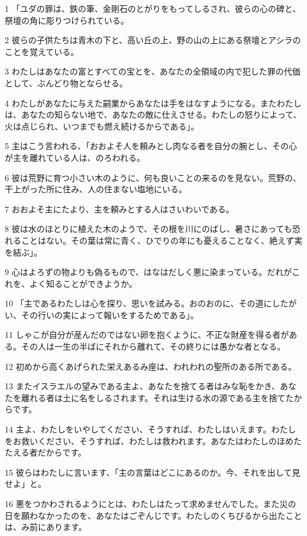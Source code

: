 \par 1 「ユダの罪は、鉄の筆、金剛石のとがりをもってしるされ、彼らの心の碑と、祭壇の角に彫りつけられている。
\par 2 彼らの子供たちは青木の下と、高い丘の上、野の山の上にある祭壇とアシラのことを覚えている。
\par 3 わたしはあなたの富とすべての宝とを、あなたの全領域の内で犯した罪の代価として、ぶんどり物とならせる。
\par 4 わたしがあなたに与えた嗣業からあなたは手をはなすようになる。またわたしは、あなたの知らない地で、あなたの敵に仕えさせる。わたしの怒りによって、火は点じられ、いつまでも燃え続けるからである」。
\par 5 主はこう言われる、「おおよそ人を頼みとし肉なる者を自分の腕とし、その心が主を離れている人は、のろわれる。
\par 6 彼は荒野に育つ小さい木のように、何も良いことの来るのを見ない。荒野の、干上がった所に住み、人の住まない塩地にいる。
\par 7 おおよそ主にたより、主を頼みとする人はさいわいである。
\par 8 彼は水のほとりに植えた木のようで、その根を川にのばし、暑さにあっても恐れることはない。その葉は常に青く、ひでりの年にも憂えることなく、絶えず実を結ぶ」。
\par 9 心はよろずの物よりも偽るもので、はなはだしく悪に染まっている。だれがこれを、よく知ることができようか。
\par 10 「主であるわたしは心を探り、思いを試みる。おのおのに、その道にしたがい、その行いの実によって報いをするためである」。
\par 11 しゃこが自分が産んだのではない卵を抱くように、不正な財産を得る者がある。その人は一生の半ばにそれから離れて、その終りには愚かな者となる。
\par 12 初めから高くあげられた栄えあるみ座は、われわれの聖所のある所である。
\par 13 またイスラエルの望みである主よ、あなたを捨てる者はみな恥をかき、あなたを離れる者は土に名をしるされます。それは生ける水の源である主を捨てたからです。
\par 14 主よ、わたしをいやしてください、そうすれば、わたしはいえます。わたしをお救いください、そうすれば、わたしは救われます。あなたはわたしのほめたたえる者だからです。
\par 15 彼らはわたしに言います、「主の言葉はどこにあるのか。今、それを出して見せよ」と。
\par 16 悪をつかわされるようにとは、わたしはたって求めませんでした。また災の日を願わなかったのを、あなたはごぞんじです。わたしのくちびるから出たことは、み前にあります。
